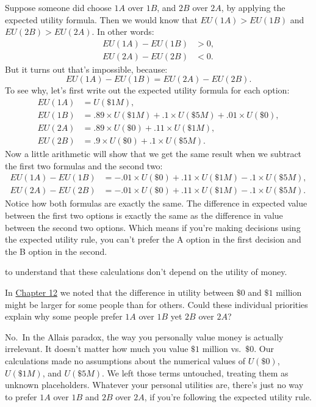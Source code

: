 \documentclass[justified]{tufte-book}
\renewcommand{\u}{U}
\newcommand{\EU}{EU}
\theoremstyle{definition}
\theoremstyle{definition}
\theoremstyle{definition}
\theoremstyle{definition}
\theoremstyle{remark}
\begin{document}
Suppose someone did choose \(1A\) over \(1B\), and \(2B\) over \(2A\), by applying the expected utility formula. Then we would know that \(\EU(1A) > \EU(1B)\) and \(\EU(2B) > \EU(2A)\). In other words:
\[
  \begin{aligned}
    \EU(1A) - \EU(1B) &> 0,\\
    \EU(2A) - \EU(2B) &< 0.
  \end{aligned}
\]
But it turns out that's impossible, because:
\[ \EU(1A) - \EU(1B) = \EU(2A) - \EU(2B). \]
To see why, let's first write out the expected utility formula for each option:
\[
  \begin{aligned}
     \EU(1A) &= \u(\$1M),\\
     \EU(1B) &= .89 \times \u(\$1M) + .1 \times \u(\$5M) + .01 \times \u(\$0),\\
     \EU(2A) &= .89 \times \u(\$0) + .11 \times \u(\$1M),\\
     \EU(2B) &= .9 \times \u(\$0) + .1 \times\u(\$5M).
  \end{aligned}
\]
Now a little arithmetic will show that we get the same result when we subtract the first two formulas and the second two:
\[
  \begin{aligned}
    \EU(1A) - \EU(1B) &= -.01 \times \u(\$0) + .11 \times \u(\$1M) - .1 \times \u(\$5M),\\
    \EU(2A) - \EU(2B) &= -.01 \times \u(\$0) + .11 \times \u(\$1M) - .1 \times \u(\$5M).
  \end{aligned}
\]
Notice how both formulas are exactly the same. The difference in expected value between the first two options is exactly the same as the difference in value between the second two options. Which means if you're making decisions using the expected utility rule, you can't prefer the A option in the first decision and the B option in the second.

 to understand that these calculations don't depend on the utility of money.

In \protect\hyperlink{utility}{Chapter 12} we noted that the difference in utility between \(\$0\) and \(\$1\) million might be larger for some people than for others. Could these individual priorities explain why some people prefer \(1A\) over \(1B\) yet \(2B\) over \(2A\)?

No.~In the Allais paradox, the way you personally value money is actually irrelevant. It doesn't matter how much you value \(\$1\) million vs.~\(\$0\). Our calculations made no assumptions about the numerical values of \(\u(\$0)\), \(\u(\$1M)\), and \(\u(\$5M)\). We left those terms untouched, treating them as unknown placeholders. Whatever your personal utilities are, there's just no way to prefer \(1A\) over \(1B\) and \(2B\) over \(2A\), if you're following the expected utility rule.
\end{document}
